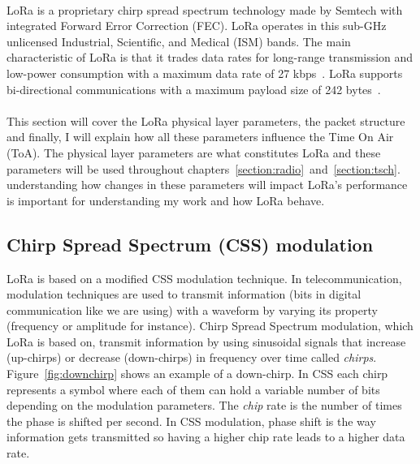 \paragraph{}

LoRa is a proprietary chirp spread spectrum technology made by Semtech with
integrated Forward Error Correction (FEC).
LoRa operates in this sub-GHz unlicensed Industrial, Scientific, and Medical
(ISM) bands.
The main characteristic of LoRa is that it trades data rates for long-range
transmission and low-power consumption with a maximum data rate of
27 kbps~\cite{8030482}.
LoRa supports bi-directional communications with a maximum payload size of 242
bytes~\cite{loraalliance:lorawanspecification}.

\paragraph{}

This section will cover the LoRa physical layer parameters, the packet
structure and finally, I will explain how all these parameters influence the
Time On Air (ToA).
The physical layer parameters are what constitutes LoRa and these parameters
will be used throughout
chapters~\ref{section:radio}~and~\ref{section:tsch}.
understanding how changes in these parameters will impact LoRa's performance
is important for understanding my work and how LoRa behave.

\subsection{Chirp Spread Spectrum (CSS) modulation}

LoRa is based on a modified CSS modulation technique.
In telecommunication, modulation techniques are used to transmit information (bits in digital communication like we are using)
with a waveform by varying its property (frequency or amplitude for instance).
Chirp Spread Spectrum modulation, which LoRa is based on, transmit information
by using sinusoidal signals that increase (up-chirps) or decrease (down-chirps)
in frequency over time called \emph{chirps}.
Figure~\ref{fig:downchirp} shows an example of a down-chirp.
In CSS each chirp represents a symbol where each of them can hold a variable number
of bits depending on the modulation parameters.
The \emph{chip} rate is the number of times the phase is shifted per second.
In CSS modulation, phase shift is the way information gets transmitted so having
a higher chip rate leads to a higher data rate.

